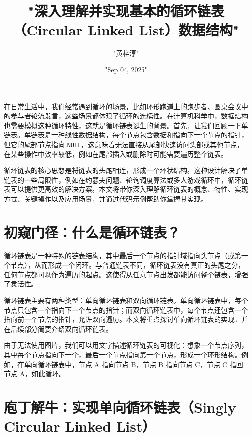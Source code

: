 \title{"深入理解并实现基本的循环链表（Circular Linked List）数据结构"}
\author{"黄梓淳"}
\date{"Sep 04, 2025"}
\maketitle
在日常生活中，我们经常遇到循环的场景，比如环形跑道上的跑步者、圆桌会议中的参与者轮流发言，这些场景都体现了循环的连续性。在计算机科学中，数据结构也需要模拟这种循环特性，这就是循环链表诞生的背景。首先，让我们回顾一下单链表。单链表是一种线性数据结构，每个节点包含数据和指向下一个节点的指针，但它的尾部节点指向 \texttt{NULL}，这意味着无法直接从尾部快速访问头部或其他节点，在某些操作中效率较低，例如在尾部插入或删除时可能需要遍历整个链表。\par
循环链表的核心思想是将链表的头尾相连，形成一个环状结构。这种设计解决了单链表的一些局限性，例如在约瑟夫问题、轮询调度算法或多人游戏循环中，循环链表可以提供更高效的解决方案。本文将带你深入理解循环链表的概念、特性、实现方式、关键操作以及应用场景，并通过代码示例帮助你掌握其实现。\par
\chapter{初窥门径：什么是循环链表？}
循环链表是一种特殊的链表结构，其中最后一个节点的指针域指向头节点（或第一个节点），从而形成一个闭环。与普通链表不同，循环链表没有真正的头尾之分，任何节点都可以作为遍历的起点。这使得从任意节点出发都能访问整个链表，增强了灵活性。\par
循环链表主要有两种类型：单向循环链表和双向循环链表。单向循环链表中，每个节点只包含一个指向下一个节点的指针；而双向循环链表中，每个节点还包含一个指向前一个节点的指针，允许双向遍历。本文将重点探讨单向循环链表的实现，并在后续部分简要介绍双向循环链表。\par
由于无法使用图片，我们可以用文字描述循环链表的可视化：想象一个节点序列，其中每个节点指向下一个，最后一个节点指向第一个节点，形成一个环形结构。例如，在单向循环链表中，节点 A 指向节点 B，节点 B 指向节点 C，节点 C 指回节点 A，如此循环。\par
\chapter{庖丁解牛：实现单向循环链表（Singly Circular Linked List）}
